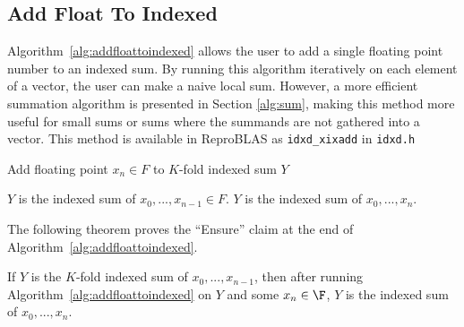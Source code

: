 \subsection{Add Float To Indexed}
  \label{sec:primitiveops_addfloattoindexed}
  Algorithm~\ref{alg:addfloattoindexed} allows the user to add a single floating
  point number to an indexed sum. By running this algorithm iteratively on each
  element of a vector, the user can make a naive local sum. However, a more
  efficient summation algorithm is presented in Section \ref{alg:sum}, making this method more useful for small sums or sums where the summands are not gathered into a vector. 
  This method is available in ReproBLAS as \texttt{idxd\_xixadd} in \texttt{idxd.h}

  \begin{alg}
    Add floating point $x_n \in F$ to $K$-fold indexed sum $Y$
    \label{alg:addfloattoindexed}
    \begin{algorithmic}[1]
      \Require
        $Y$ is the indexed sum of $x_0, ..., x_{n - 1} \in F$.
        \State {}
        \State {}
        \State {}
      \EndFunction
      \Ensure
        $Y$ is the indexed sum of $x_0, ..., x_{n}$.
    \end{algorithmic}
  \end{alg}

  The following theorem proves the ``Ensure'' claim at the end of Algorithm~\ref{alg:addfloattoindexed}.
  \begin{thm}
    If $Y$ is the $K$-fold indexed sum of $x_0, ..., x_{n - 1}$, then after
    running Algorithm~\ref{alg:addfloattoindexed} on $Y$ and some $x_n \in \F$,
    $Y$ is the indexed sum of $x_0, ..., x_n$.
    \label{thm:addfloattoindexed}
  \end{thm}

